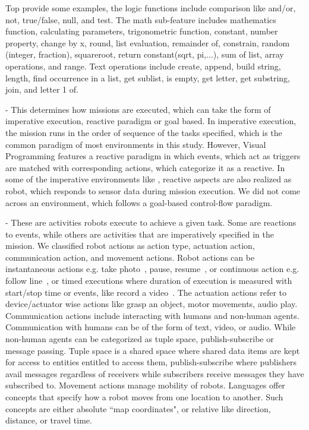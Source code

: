 Top provide some examples, the logic functions include comparison like and/or, not, true/false, null, and test. The math sub-feature includes mathematics function, calculating parameters, trigonometric function, constant, number property, change by x, round, list evaluation, remainder of, constrain, random (integer, fraction), squareroot, return constant(sqrt, pi,...), sum of list, array operations, and range. Text operations include create, append, build string, length, find occurrence in a list, get sublist, is empty, get letter, get substring, join, and letter 1 of.  %

 - This determines how missions are executed, which can take the form of imperative execution, reactive paradigm or goal based. In imperative execution, the mission runs in the order of sequence of the tasks specified, which is the common paradigm of most environments in this study. However, \aseba Visual Programming features a reactive paradigm in which events, which act as triggers are matched with corresponding actions, which categorize it as a reactive. In some of the imperative environments like \picaxe, reactive aspects are also realized as robot, which responds to sensor data during mission execution. We did not come across an environment, which follows a goal-based control-flow paradigm.

 
 - These are activities robots execute to achieve a given task. Some are reactions to events, while others are activities that are imperatively specified in the mission. We classified robot actions as action type, actuation action, communication action, and movement actions. Robot actions  can be instantaneous actions e.g. take photo~\cite{FLYAQ}, pause, resume~\cite{PICAXE}, or continuous action e.g. follow line~\cite{LEGO,Sphero}, or timed executions where duration of execution is measured with start/stop time or events, like record a video~\cite{FLYAQ}. The actuation actions refer to device/actuator wise actions like grasp an object, motor movements, audio play. Communication actions include interacting with humans and non-human agents.  Communication with humans can be of the form of text, video, or audio. While non-human agents can  be categorized as tuple space, publish-subscribe or message passing. Tuple space is a shared space where shared data items are kept for access to entities entitled to access them, publish-subscribe where publishers avail messages regardless of receivers while subscribers receive messages they have subscribed to.
Movement actions manage mobility of robots. Languages offer concepts that specify how a robot moves from one location to another. Such  concepts are either absolute ``map coordinates", or relative like direction, distance, or travel time.\\

